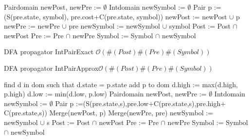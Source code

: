 \begin{algorithm}[H]
\begin{algorithmic}[1]
\State Pairdomain newPost, newPre := $\emptyset$
\State Intdomain newSymbol := $\emptyset$
		\State Pair p := (S(pre.state, symbol), pre.cost+C(pre.state, symbol))
			\State newPost := newPost $\cup$ p
			\State newPre := newPre $\cup$ pre
			\State newSymbol := newSymbol $\cup$ symbol 
		\EndIf
	\EndFor
\EndFor
\State Post := Post $\cap$ newPost
\State Pre := Pre $\cap$ newPre
\State Symbol := Symbol $\cap$ newSymbol
\EndProcedure
\end{algorithmic}
\caption{DFA propagator IntPairExact \newline
 $\mathcal{O}(\#(Post)\#(Pre)\#(Symbol))$}
\label{fig:algexact}
\end{algorithm}
\begin{algorithm}[H]
\label{fig:algapprox}
\caption{DFA propagator IntPairApprox\newline $\mathcal{O}(\#(Post)\#(Pre)\#(Symbol))$}
\begin{algorithmic}[1]
	\State find d in dom such that d.state = p.state
		\State add p to dom
	\Else	
		\State d.high := max(d.high, p.high)
		\State d.low := min(d.low, p.low)
	\EndIf
\EndProcedure
{}
\State Pairdomain newPost, newPre := $\emptyset$
\State Intdomain newSymbol := $\emptyset$
		\State Pair p :=(S(pre.state,s),pre.low+C(pre.state,s),pre.high+ C(pre.state,s))
			\State Merge(newPost, p)
			\State Merge(newPre, pre)
			\State newSymbol := newSymbol $\cup$ s
		\EndIf
	\EndFor
\EndFor
\State Post := Post $\cap$ newPost
\State Pre := Pre $\cap$ newPre
\State Symbol := Symbol $\cap$ newSymbol
\EndProcedure
\end{algorithmic}
\end{algorithm}
